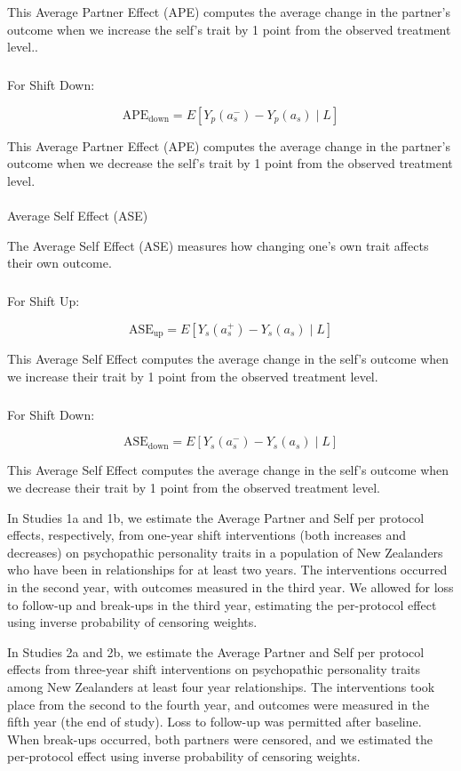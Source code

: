 \documentclass[
  single column]{article}
\makeatletter
\let\oldparagraph\paragraph
\renewcommand{\paragraph}{
    \@ifstar
      \xxxParagraphStar
      \xxxParagraphNoStar
  }
\newcommand{\xxxParagraphStar}[1]{\oldparagraph*{#1}\mbox{}}
\newcommand{\xxxParagraphNoStar}[1]{\oldparagraph{#1}\mbox{}}
\let\oldsubparagraph\subparagraph
\renewcommand{\subparagraph}{
    \@ifstar
      \xxxSubParagraphStar
      \xxxSubParagraphNoStar
  }
\newcommand{\xxxSubParagraphStar}[1]{\oldsubparagraph*{#1}\mbox{}}
\newcommand{\xxxSubParagraphNoStar}[1]{\oldsubparagraph{#1}\mbox{}}
\makeatother
\begin{document}
This Average Partner Effect (APE) computes the average change in the
partner's outcome when we increase the self's trait by 1 point from the
observed treatment level..

\subparagraph{For Shift Down:}\label{for-shift-down}

\[
\text{APE}_{\text{down}} = E\left[ Y_p(a_s^-) - Y_p(a_s) \mid L \right]
\]

This Average Partner Effect (APE) computes the average change in the
partner's outcome when we decrease the self's trait by 1 point from the
observed treatment level.

\paragraph{Average Self Effect (ASE)}\label{average-self-effect-ase}

The Average Self Effect (ASE) measures how changing one's own trait
affects their own outcome.

\subparagraph{For Shift Up:}\label{for-shift-up-1}

\[
\text{ASE}_{\text{up}} = E\left[ Y_s(a_s^+) - Y_s(a_s) \mid L \right]
\]

This Average Self Effect computes the average change in the self's
outcome when we increase their trait by 1 point from the observed
treatment level.

\subparagraph{For Shift Down:}\label{for-shift-down-1}

\[
\text{ASE}_{\text{down}} = E\left[ Y_s(a_s^-) - Y_s(a_s) \mid L \right]
\]

This Average Self Effect computes the average change in the self's
outcome when we decrease their trait by 1 point from the observed
treatment level.

In Studies 1a and 1b, we estimate the Average Partner and Self per
protocol effects, respectively, from one-year shift interventions (both
increases and decreases) on psychopathic personality traits in a
population of New Zealanders who have been in relationships for at least
two years. The interventions occurred in the second year, with outcomes
measured in the third year. We allowed for loss to follow-up and
break-ups in the third year, estimating the per-protocol effect using
inverse probability of censoring weights.

In Studies 2a and 2b, we estimate the Average Partner and Self per
protocol effects from three-year shift interventions on psychopathic
personality traits among New Zealanders at least four year
relationships. The interventions took place from the second to the
fourth year, and outcomes were measured in the fifth year (the end of
study). Loss to follow-up was permitted after baseline. When break-ups
occurred, both partners were censored, and we estimated the per-protocol
effect using inverse probability of censoring weights.
\end{document}
